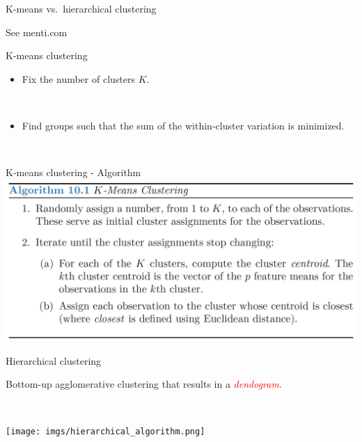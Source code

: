 \documentclass[
  10pt,
  ignorenonframetext,
]{beamer}
\providecommand{\tightlist}{%
  \setlength{\itemsep}{0pt}\setlength{\parskip}{0pt}}
\begin{document}
\begin{frame}
\begin{block}{K-means vs.~hierarchical clustering}
\label{k-means-vs.-hierarchical-clustering}
\(~\)

See menti.com
\end{block}
\end{frame}

\begin{frame}
\begin{block}{K-means clustering}
\label{k-means-clustering}
\(~\)

\begin{itemize}
\tightlist
\item
  Fix the number of clusters \(K\).
\end{itemize}

\(~\)

\begin{itemize}
\tightlist
\item
  Find groups such that the sum of the within-cluster variation is
  minimized.
\end{itemize}

\(~\)
\end{block}
\end{frame}

\begin{frame}{K-means clustering - Algorithm}
\label{k-means-clustering---algorithm}
\includegraphics{imgs/kmeans_algo.png}
\end{frame}

\begin{frame}
\begin{block}{Hierarchical clustering}
\label{hierarchical-clustering}
\(~\)

Bottom-up agglomerative clustering that results in a
\emph{\textcolor{red}{dendogram}}.

\(~\)

\texttt{[image: imgs/hierarchical\_algorithm.png]}
\end{block}
\end{frame}
\end{document}
